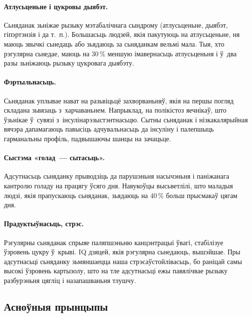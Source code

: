 \paragraph{Атлусьценьне і цукровы дыябэт.}
Сьняданак зьніжае рызыку мэтабалічнага сындрому (атлусьценьне, дыябэт, гіпэртэнзія і да т.~п.). Большасьць людзей, якія пакутуюць на атлусьценьне, ня маюць звычкі сьнедаць або зьядаюць за сьняданкам вельмі мала. Тыя, хто рэгулярна сьнедае, маюць на 30\,\% меншую імавернасьць атлусьценьня і ў~два разы зьніжаюць рызыку цукровага дыябэту.

\paragraph{Фэртыльнасьць.}
Сьняданак уплывае нават на разьвіцьцё захворваньняў, якія на першы погляд складана зьвязаць з~харчаваньнем. Напрыклад, на полікістоз яечнікаў, што ўзьнікае ў~сувязі з~інсулінарэзыстэнтнасьцю. Сытны сьняданак і нізкакалярыйная вячэра дапамагаюць павысіць адчувальнасьць да інсуліну і палепшыць гарманальны профіль, падвышаючы шанцы на зачацьце.

\paragraph{Сыстэма «голад~--- сытасьць».}
Адсутнасьць сьняданку прыводзіць да парушэньня насычэньня і паніжанага кантролю голаду на працягу ўсяго дня. Навукоўцы высьветлілі, што маладыя людзі, якія прапускаюць сьняданак, зьядаюць на 40\,\% больш прысмакаў цягам дня.


\paragraph{Прадуктыўнасьць, стрэс.}
Рэгулярны сьняданак спрыяе паляпшэньню канцэнтрацыі ўвагі, стабілізуе ўзровень цукру ў~крыві. IQ дзяцей, якія рэгулярна сьнедаюць, вышэйшае. Пры адсутнасьці сьняданку зьмяншаецца наша стрэсаўстойлівасьць, бо раніцай самы высокі ўзровень картызолу, што на тле адсутнасьці ежы павялічвае рызыку разбурэньня цягліц і назапашваньня тлушчу.

\subsection{Асноўныя прынцыпы}

